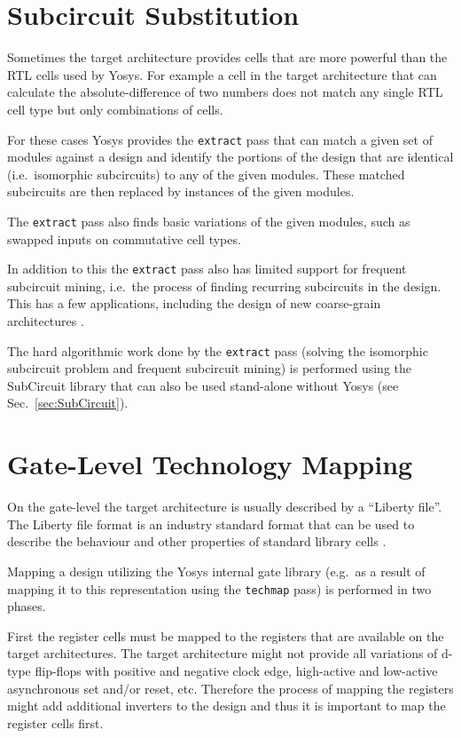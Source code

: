 \section{Subcircuit Substitution}

Sometimes the target architecture provides cells that are more powerful than
the RTL cells used by Yosys. For example a cell in the target architecture that can
calculate the absolute-difference of two numbers does not match any single
RTL cell type but only combinations of cells.

For these cases Yosys provides the {\tt extract} pass that can match a given set
of modules against a design and identify the portions of the design that are
identical (i.e.~isomorphic subcircuits) to any of the given modules. These
matched subcircuits are then replaced by instances of the given modules.

The {\tt extract} pass also finds basic variations of the given modules,
such as swapped inputs on commutative cell types.

In addition to this the {\tt extract} pass also has limited support for
frequent subcircuit mining, i.e.~the process of finding recurring subcircuits
in the design. This has a few applications, including the design of new
coarse-grain architectures \cite{intersynthFdlBookChapter}.

The hard algorithmic work done by the {\tt extract} pass (solving the
isomorphic subcircuit problem and frequent subcircuit mining) is performed
using the SubCircuit library that can also be used stand-alone without Yosys
(see Sec.~\ref{sec:SubCircuit}).

\section{Gate-Level Technology Mapping}
\label{sec:techmap_extern}

On the gate-level the target architecture is usually described by a ``Liberty
file''. The Liberty file format is an industry standard format that can be
used to describe the behaviour and other properties of standard library cells
.

Mapping a design utilizing the Yosys internal gate library (e.g.~as a result
of mapping it to this representation using the {\tt techmap} pass) is
performed in two phases.

First the register cells must be mapped to the registers that are available
on the target architectures. The target architecture might not provide all
variations of d-type flip-flops with positive and negative clock edge,
high-active and low-active asynchronous set and/or reset, etc. Therefore the
process of mapping the registers might add additional inverters to the design
and thus it is important to map the register cells first.

